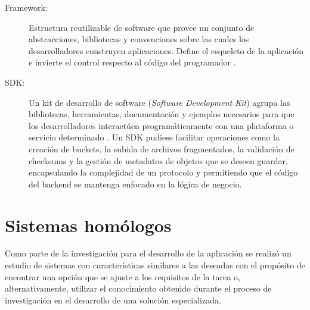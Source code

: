 \begin{description}
  \item[Framework:] Estructura reutilizable de software que provee un conjunto de abstracciones,
  bibliotecas y convenciones sobre las cuales los desarrolladores construyen aplicaciones. Define
  el esqueleto de la aplicación e invierte el control respecto al código del programador
  \citep{Sommerville2015}.

  \item[SDK:] Un kit de desarrollo de software (\textit{Software Development Kit}) agrupa las
  bibliotecas, herramientas, documentación y ejemplos necesarios para que los desarrolladores
  interactúen programáticamente con una plataforma o servicio determinado
  \citep{Messerschmitt2003}. Un SDK pudiese facilitar operaciones como la creación de buckets, 
  la subida de archivos fragmentados, la validación de checksums y la gestión de metadatos de objetos 
  que se deseen guardar, encapsulando la complejidad de un protocolo y permitiendo que el código del backend 
  se mantenga enfocado en la lógica de negocio.
\end{description}

\section{Sistemas homólogos}

Como parte de la investigación para el desarrollo de la aplicación se realizó un estudio de sistemas
con características similares a las deseadas con el propósito de encontrar una opción que se ajuste a
los requisitos de la tarea o, alternativamente, utilizar el conocimiento obtenido durante el proceso
de investigación en el desarrollo de una solución especializada. 

